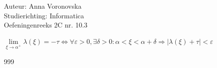\documentclass[a4paper]{article}
\begin{document}
  
\noindent \large Auteur: Anna Voronovska \\
\noindent \large Studierichting: Informatica\\
\noindent \large Oefeningenreeks 2C nr. 10.3\\

\medskip

\normalsize

$\lim\limits_{\xi \to \alpha^+} \lambda(\xi) = -\tau \Leftrightarrow \forall\varepsilon > 0, \exists\delta > 0 : \alpha < \xi < \alpha + \delta \Rightarrow |\lambda(\xi) + \tau| < \varepsilon$

\begin{thebibliography}{999}
\end{thebibliography}
\end{document}
